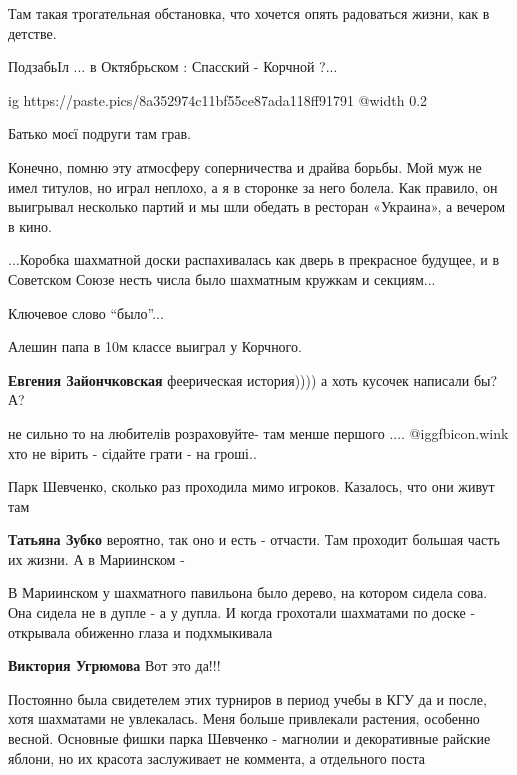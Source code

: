 \begin{itemize}
Там такая трогательная обстановка, что хочется опять радоваться жизни, как в детстве.

ПодзабьІл ...
в Октябрьском : Спасский - Корчной ?...


\ifcmt
  ig https://paste.pics/8a352974c11bf55ce87ada118ff91791
  @width 0.2
\fi

Батько моєї подруги там грав.


Конечно, помню эту атмосферу соперничества и драйва борьбы. Мой муж не имел
титулов, но играл неплохо, а я в сторонке за него болела. Как правило, он
выигрывал несколько партий и мы шли обедать в ресторан «Украина», а вечером в
кино.


...Коробка шахматной доски распахивалась как дверь в прекрасное будущее, и в
Советском Союзе несть числа было шахматным кружкам и секциям...

Ключевое слово \enquote{было}...

Алешин папа в 10м классе выиграл у Корчного.

\textbf{Евгения Зайончковская} феерическая история)))) а хоть кусочек написали бы? А?

не сильно то на любителів розраховуйте- там менше першого ....
@igg{fbicon.wink} хто не вірить - сідайте грати - на гроші..

Парк Шевченко, сколько раз проходила мимо игроков. Казалось, что они живут там

\begin{itemize} %
\textbf{Татьяна Зубко} вероятно, так оно и есть - отчасти. Там проходит большая часть их жизни. А в Мариинском -
\end{itemize} %


В Мариинском у шахматного павильона было дерево, на котором сидела сова. Она
сидела не в дупле - а у дупла. И когда грохотали шахматами по доске - открывала
обиженно глаза и подхмыкивала

\textbf{Виктория Угрюмова} Вот это да!!!


Постоянно была свидетелем этих турниров в период учебы в КГУ да и после, хотя
шахматами не увлекалась. Меня больше привлекали растения, особенно весной.
Основные фишки парка Шевченко - магнолии и декоративные райские яблони, но их
красота заслуживает не коммента, а отдельного поста


\end{itemize}
